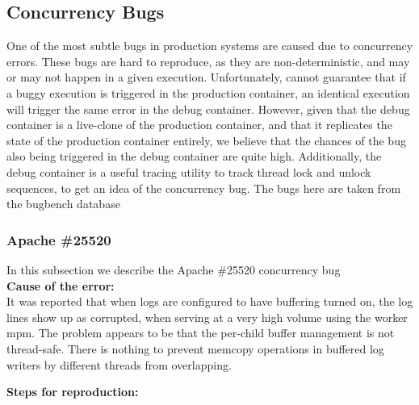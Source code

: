 \subsection{Concurrency Bugs}
One of the most subtle bugs in production systems are caused due to concurrency errors.
These bugs are hard to reproduce, as they are non-deterministic, and may or may not happen in a given execution.
Unfortunately, \parikshan cannot guarantee that if a buggy execution is triggered in the production container, an identical execution will trigger the same error in the debug container.
However, given that the debug container is a live-clone of the production container, and that it replicates the state of the production container entirely, we believe that the chances of the bug also being triggered in the debug container are quite high.
Additionally, the debug container is a useful tracing utility to track thread lock and unlock sequences, to get an idea of the concurrency bug.
The bugs here are taken from the bugbench database~\cite{bugbench}

\subsubsection{Apache \#25520}

In this subsection we describe the Apache \#25520 concurrency bug \\

\noindent \textbf{Cause of the error:} \\

It was reported that when logs are configured to have buffering turned on, the log lines show up as corrupted, when serving at a very high volume using the worker mpm.
The problem appears to be that the per-child buffer management is not thread-safe.
There is nothing to prevent memcopy operations in buffered log writers by different threads from overlapping.
 

\noindent \textbf{Steps for reproduction:} \\

